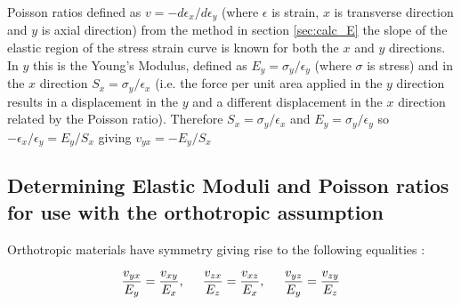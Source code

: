 \documentclass[10pt]{article}
\begin{document}
Poisson ratios defined as \(v = -d\epsilon_x /d\epsilon_y \)  \citep{bodig_jozsef_jayne_mechanics_1982} (where \(\epsilon\) is strain, \(x\) is transverse direction and \(y\) is axial direction) from the method in section \ref{sec:calc_E} the slope of the elastic region of the stress strain curve is known for both the \(x\) and \(y\) directions. In \(y\) this is the Young's Modulus, defined as \(E_y = \sigma_y / \epsilon_y\) (where \(\sigma\) is stress)  \citep{bodig_jozsef_jayne_mechanics_1982} and in the \(x\) direction \(S_x = \sigma_y / \epsilon_x\) (i.e. the force per unit area applied in the \(y\) direction results in a displacement in the \(y\) and a different displacement in the \(x\) direction related by the Poisson ratio). Therefore \(S_x = \sigma_y / \epsilon_x \) and \(E_y = \sigma_y / \epsilon_y\) so \(-\epsilon_x / \epsilon_y = E_y/S_x\) giving \(v_{yx} = -E_y/S_x\)

\subsection{Determining Elastic Moduli and Poisson ratios for use with the orthotropic assumption}
\label{sec:orthotropic_assumption}
Orthotropic materials have symmetry giving rise to the following equalities \citep{salencon_handbook_2001}:

\begin{equation}\label{eqn:equalities}
\frac{v_{yx}}{E_y}=\frac{v_{xy}}{E_x},\hspace{0.5cm} \frac{v_{zx}}{E_z}=\frac{v_{xz}}{E_x},\hspace{0.5cm} \frac{v_{yz}}{E_y}=\frac{v_{zy}}{E_z}
\end{equation}
\end{document}
